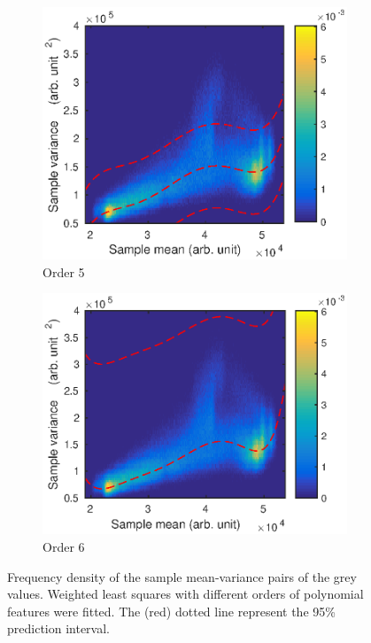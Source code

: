 \documentclass[12pt]{report}
\begin{document}
\begin{figure}
\begin{subfigure}{0.45\textwidth}
		\includegraphics[width=\textwidth]{figures/meanVar/order5.eps}
		\caption{Order 5}
	\end{subfigure}
	\begin{subfigure}{0.45\textwidth}
		\includegraphics[width=\textwidth]{figures/meanVar/order6.eps}
		\caption{Order 6}
	\end{subfigure}
	\caption{Frequency density of the sample mean-variance pairs of the grey values. Weighted least squares with different orders of polynomial features were fitted. The (red) dotted line represent the 95\% prediction interval.}
	\label{fig:weightedLS_polynomials}
\end{figure}
\end{document}
